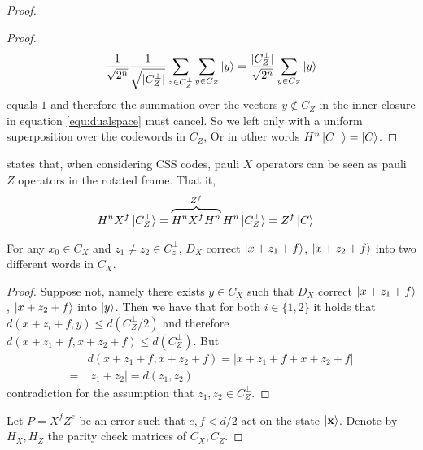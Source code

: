 \begin{proof}
\begin{proof}
       \begin{equation}
         \begin{split}
           \frac{1}{ \sqrt{ 2^{n}}} \frac{1}{\sqrt{|C_{Z}^{\perp}|}} \sum_{z \in C_{Z}^{\perp}}{  \sum_{y \in C_{Z}}{  \ket{y}  }  } = \frac{ |C_{Z}^{\perp}|}{ \sqrt{ 2^{n}}}  \sum_{y \in C_{Z}}{  \ket{y}  }  
         \end{split}
       \end{equation} equals $1$ and therefore the summation over the vectors $y \not\in C_{Z}$ in the inner closure in equation \ref{equ:dualspace} must cancel. So we left only with a uniform superposition over the codewords in $C_{Z}$, Or in other words $H^{n}\ket{C^{\perp}} = \ket{C}$.  
    \end{proof}
   states that, when considering CSS codes,  pauli $X$ operators can be seen as pauli $Z$ operators in the rotated frame. That it, \begin{equation*}
    \begin{split}
      H^{n} X^{f} \ket{ C_{Z}^{\perp} } & =  \overbrace{H^{n}X^{f}H^{n}}^{ Z^{f}} H^{n} \ket{C^{\perp}_{Z} }  = Z^{f}\ket{C}
    \end{split}
  \end{equation*}
    \begin{claim}
      For any $x_{0} \in C_{X}$ and $z_{1}\neq z_{2} \in C_{z}^{\perp}$, $D_{X}$ correct $\ket{x+z_{1}+f}$, $\ket{x+z_{2}+f}$ into two different words in $C_{X}$. 
    \begin{proof}
      Suppose not, namely there exists $y \in C_{X}$ such that $D_{X}$ correct $\ket{x+z_{1}+f}$, $\ket{x+z_{2}+f}$ into $\ket{y}$. Then we have that for both $i\in \{1,2\}$ it holds that  $d\left( x+z_{i} +f, y \right) \le d\left( C_{Z}^{\perp}/2 \right)$ and therefore $ d\left( x + z_{1} + f, x+z_{2} +f  \right) \le d\left( C_{Z}^{\perp} \right)$. But
      \begin{equation*}
        \begin{split}
            & d\left( x + z_{1} + f, x+z_{2} +f  \right) =  | x + z_{1} + f + x + z_{2} + f | \\
            =  & | z_{1} + z_{2} | = d\left( z_{1},z_{2} \right) 
        \end{split}
      \end{equation*}     
      contradiction for the assumption that $z_{1},z_{2} \in C_{Z}^{\perp}$.   
    \end{proof}
    \end{claim} 
    Let $P = X^{f}Z^{e}$ be an error such that $e, f < d/2$ act on the state $\ket{\mathbf{x}}$. Denote by $H_{X}, H_{Z}$ the parity check matrices of $C_{X},C_{Z}$. 

\end{proof}
